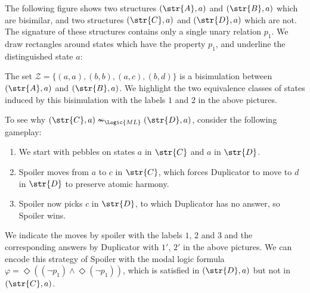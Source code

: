\begin{example}
  The following figure shows two structures $(\str{A}, {a})$ and $(\str{B}, {a})$ which are bisimilar, and two structures $(\str{C}, {a})$ and $(\str{D}, {a})$ which are not.
  The signature of these structures contains only a single unary relation $p_{1}$.
  We draw rectangles around states which have the property $p_{1}$, and underline the distinguished state $a$:

  \vspace{1em}
  
  \vspace{-1em}

  \noindent
  The set $\mathcal{Z} = \{(a,a), (b,b), (a,c), (b,d) \}$ is a bisimulation between $(\str{A}, {a})$ and $(\str{B}, {a})$.
  We highlight the two equivalence classes of states induced by this bisimulation with the labels $1$ and $2$ in the above pictures.

  \noindent
  To see why $(\str{C}, {a}) \nsim_{\Logic{ML}} (\str{D}, {a})$, consider the following gameplay:
  \begin{enumerate}
    \item We start with pebbles on states ${a}$ in $\str{C}$ and ${a}$ in $\str{D}$.
    \item Spoiler moves from ${a}$ to $c$ in $\str{C}$, which forces Duplicator to move to $d$ in $\str{D}$ to preserve atomic harmony.
    \item Spoiler now picks $c$ in $\str{D}$, to which Duplicator has no answer, so Spoiler wins.
  \end{enumerate}
  We indicate the moves by spoiler with the labels $1$, $2$ and $3$ and the corresponding answers by Duplicator with $1'$, $2'$ in the above pictures.
  We can encode this strategy of Spoiler with the modal logic formula $\varphi = \Diamond((\neg p_{1}) \land \Diamond (\neg p_{1}))$, which is satisfied in $(\str{D}, {a})$ but not in $(\str{C}, {a})$.
\end{example}

